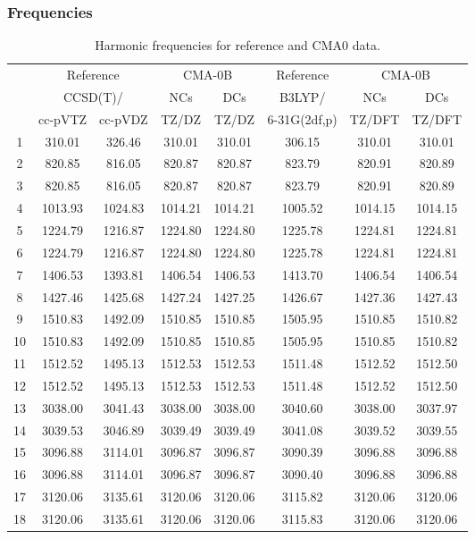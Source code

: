 \documentclass[10pt,oneside]{article}
\begin{document}
\subsubsection*{Frequencies}
\begin{table}[h!]
\centering
\caption{Harmonic frequencies for reference and CMA0 data.}
\begin{tabular}{cccccccc}
\toprule
{} & \multicolumn{2}{c}{Reference} & \multicolumn{2}{c}{CMA-0B} &    Reference & \multicolumn{2}{c}{CMA-0B} \\
{} & \multicolumn{2}{c}{CCSD(T)/} &     NCs &     DCs &       B3LYP/ &     NCs &     DCs \\
{} &   cc-pVTZ & cc-pVDZ &   TZ/DZ &   TZ/DZ & 6-31G(2df,p) &  TZ/DFT &  TZ/DFT \\
\midrule
1  &    310.01 &  326.46 &  310.01 &  310.01 &       306.15 &  310.01 &  310.01 \\
2  &    820.85 &  816.05 &  820.87 &  820.87 &       823.79 &  820.91 &  820.89 \\
3  &    820.85 &  816.05 &  820.87 &  820.87 &       823.79 &  820.91 &  820.89 \\
4  &   1013.93 & 1024.83 & 1014.21 & 1014.21 &      1005.52 & 1014.15 & 1014.15 \\
5  &   1224.79 & 1216.87 & 1224.80 & 1224.80 &      1225.78 & 1224.81 & 1224.81 \\
6  &   1224.79 & 1216.87 & 1224.80 & 1224.80 &      1225.78 & 1224.81 & 1224.81 \\
7  &   1406.53 & 1393.81 & 1406.54 & 1406.53 &      1413.70 & 1406.54 & 1406.54 \\
8  &   1427.46 & 1425.68 & 1427.24 & 1427.25 &      1426.67 & 1427.36 & 1427.43 \\
9  &   1510.83 & 1492.09 & 1510.85 & 1510.85 &      1505.95 & 1510.85 & 1510.82 \\
10 &   1510.83 & 1492.09 & 1510.85 & 1510.85 &      1505.95 & 1510.85 & 1510.82 \\
11 &   1512.52 & 1495.13 & 1512.53 & 1512.53 &      1511.48 & 1512.52 & 1512.50 \\
12 &   1512.52 & 1495.13 & 1512.53 & 1512.53 &      1511.48 & 1512.52 & 1512.50 \\
13 &   3038.00 & 3041.43 & 3038.00 & 3038.00 &      3040.60 & 3038.00 & 3037.97 \\
14 &   3039.53 & 3046.89 & 3039.49 & 3039.49 &      3041.08 & 3039.52 & 3039.55 \\
15 &   3096.88 & 3114.01 & 3096.87 & 3096.87 &      3090.39 & 3096.88 & 3096.88 \\
16 &   3096.88 & 3114.01 & 3096.87 & 3096.87 &      3090.40 & 3096.88 & 3096.88 \\
17 &   3120.06 & 3135.61 & 3120.06 & 3120.06 &      3115.82 & 3120.06 & 3120.06 \\
18 &   3120.06 & 3135.61 & 3120.06 & 3120.06 &      3115.83 & 3120.06 & 3120.06 \\
\bottomrule
\end{tabular}
\end{table}
\end{document}
